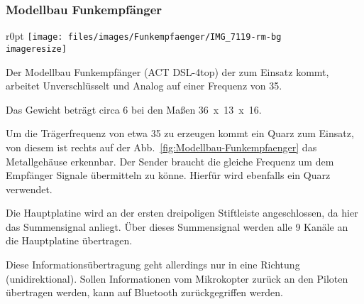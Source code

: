 \subsubsection{Modellbau Funkempfänger}
\begin{wrapfigure}{r}{0pt}
	\texttt{[image: files/images/Funkempfaenger/IMG\_7119-rm-bg\\imageresize]}
	\label{fig:Modellbau-Funkempfaenger}
\end{wrapfigure}

Der Modellbau Funkempfänger (ACT DSL-4top) der zum Einsatz kommt,
arbeitet Unverschlüsselt und Analog auf einer Frequenz von \unit{35}{\mega\hertz}.

Das Gewicht beträgt circa \unit{6}{\gram}
bei den Maßen \unit{36 x 13 x 16}{\milli\metre}.

Um die Trägerfrequenz von etwa \unit{35}{\mega\hertz}
zu erzeugen kommt ein Quarz zum Einsatz,
von diesem ist rechts auf der Abb.~\vref{fig:Modellbau-Funkempfaenger}
das Metallgehäuse erkennbar.
Der Sender braucht die gleiche Frequenz um dem Empfänger Signale übermitteln zu könne.
Hierfür wird ebenfalls ein Quarz verwendet.

Die Hauptplatine wird an der ersten dreipoligen Stiftleiste angeschlossen,
da hier das Summensignal anliegt.
Über dieses Summensignal werden alle 9 Kanäle an die Hauptplatine übertragen.

Diese Informationsübertragung geht allerdings nur in eine Richtung (unidirektional).
Sollen Informationen vom Mikrokopter zurück an den Piloten übertragen werden,
kann auf Bluetooth zurückgegriffen werden.
